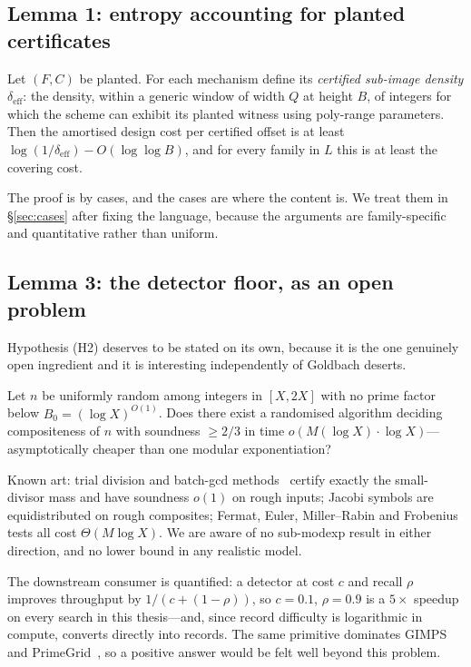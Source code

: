 \subsection{Lemma 1: entropy accounting for planted certificates}

\begin{lemma}\label{lem:entropy}
Let $(F,C)$ be planted. For each mechanism define its \emph{certified sub-image
density} $\delta_{\text{eff}}$: the density, within a generic window of width
$Q$ at height $B$, of integers for which the scheme can exhibit its planted
witness using poly-range parameters. Then the amortised design cost per
certified offset is at least $\log(1/\delta_{\text{eff}})-O(\log\log B)$, and
for every family in $L$ this is at least the covering cost.
\end{lemma}

The proof is by cases, and the cases are where the content is. We treat them in
\S\ref{sec:cases} after fixing the language, because the arguments are
family-specific and quantitative rather than uniform.

\subsection{Lemma 3: the detector floor, as an open problem}

Hypothesis (H2) deserves to be stated on its own, because it is the one
genuinely open ingredient and it is interesting independently of Goldbach
deserts.

\begin{conjecture}\label{conj:h2}
Let $n$ be uniformly random among integers in $[X,2X]$ with no prime factor
below $B_0=(\log X)^{O(1)}$. Does there exist a randomised algorithm deciding
compositeness of $n$ with soundness $\ge2/3$ in time
$o(M(\log X)\cdot\log X)$---asymptotically cheaper than one modular
exponentiation?
\end{conjecture}

Known art: trial division and batch-gcd methods~\cite{Bernstein} certify exactly
the small-divisor mass and have soundness $o(1)$ on rough inputs; Jacobi symbols
are equidistributed on rough composites; Fermat, Euler, Miller--Rabin and
Frobenius tests all cost $\Theta(M\log X)$. We are aware of no sub-modexp result
in either direction, and no lower bound in any realistic model.

The downstream consumer is quantified: a detector at cost $c$ and recall $\rho$
improves throughput by $1/(c+(1-\rho))$, so $c=0.1$, $\rho=0.9$ is a $5\times$
speedup on every search in this thesis---and, since record difficulty is
logarithmic in compute, converts directly into records. The same primitive
dominates GIMPS and PrimeGrid~\cite{PrimeGrid}, so a positive answer would be
felt well beyond this problem.


